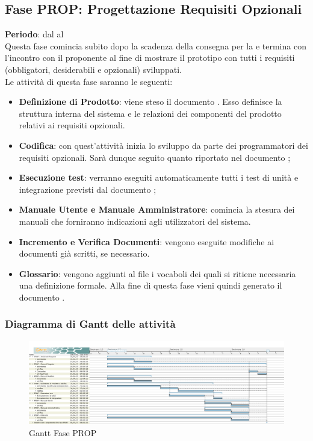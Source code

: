 \subsection{Fase PROP: Progettazione Requisiti Opzionali}
	\textbf{Periodo}: dal  al  \\Questa fase comincia subito dopo la scadenza della consegna per la  e termina con l'incontro con il proponente al fine di mostrare il prototipo con tutti i requisiti (obbligatori, desiderabili e opzionali) sviluppati. 
	\\Le attività di questa fase saranno le seguenti:
	\begin{itemize}
		\item\textbf{Definizione di Prodotto}: viene steso il documento . Esso definisce la struttura interna del sistema e le relazioni dei componenti del prodotto relativi ai requisiti opzionali.
		\item \textbf{Codifica}: con quest'attività inizia lo sviluppo da parte dei programmatori dei requisiti opzionali. Sarà dunque seguito quanto riportato nel documento ;
		\item \textbf{Esecuzione test}: verranno eseguiti automaticamente tutti i test di unità e integrazione previsti dal documento ;
		\item\textbf{Manuale Utente e Manuale Amministratore}: comincia la stesura dei manuali che forniranno indicazioni agli utilizzatori del sistema.
		\item\textbf{Incremento e Verifica Documenti}: vengono eseguite modifiche ai documenti già scritti, se necessario.
		\item\textbf{Glossario}: vengono aggiunti al file  i vocaboli dei quali si ritiene necessaria una definizione formale. Alla fine di questa fase vieni quindi generato il documento .
	\end{itemize}
	\subsubsection{Diagramma di Gantt delle attività}
	\begin{figure}[H]\centering
		\includegraphics[width=\textwidth]{PianoDiProgetto/Pics/FasePROP.png}
	\caption{Gantt Fase PROP}
\end{figure}